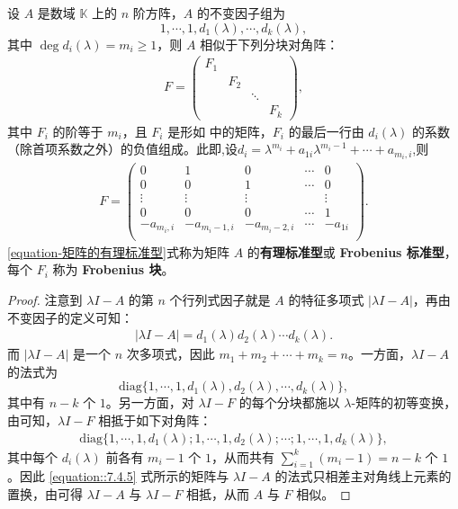 \documentclass[../../main.tex]{subfiles}
\begin{document}
\begin{theorem}
设 $A$ 是数域 $\mathbb{K}$ 上的 $n$ 阶方阵，$A$ 的不变因子组为
\[
1,\cdots,1,d_1(\lambda),\cdots,d_k(\lambda),
\]
其中 $\deg d_i(\lambda)=m_i\geq1$，则 $A$ 相似于下列分块对角阵：
\begin{align}\label{equation-矩阵的有理标准型}
F = \begin{pmatrix}
F_1 & & & \\
& F_2 & & \\
& & \ddots & \\
& & & F_k
\end{pmatrix},
\end{align}
其中 $F_i$ 的阶等于 $m_i$，且 $F_i$ 是形如 中的矩阵，$F_i$ 的最后一行由 $d_i(\lambda)$ 的系数（除首项系数之外）的负值组成。此即,设$d_i=\lambda ^{m_i}+a_{1i}\lambda ^{m_i-1}+\cdots +a_{m_i,i}$,则
\begin{align*}
F=\left( \begin{matrix}
0&		1&		0&		\cdots&		0\\
0&		0&		1&		\cdots&		0\\
\vdots&		\vdots&		\vdots&		&		\vdots\\
0&		0&		0&		\cdots&		1\\
-a_{m_i,i}&		-a_{m_i-1,i}&		-a_{m_i-2,i}&		\cdots&		-a_{1i}\\
\end{matrix} \right) .
\end{align*}
\eqref{equation-矩阵的有理标准型}式称为矩阵 $A$ 的\textbf{有理标准型}或 \textbf{Frobenius 标准型}，每个 $F_i$ 称为 \textbf{Frobenius 块}。 
\end{theorem}
\begin{proof}
注意到 $\lambda I - A$ 的第 $n$ 个行列式因子就是 $A$ 的特征多项式 $|\lambda I - A|$，再由不变因子的定义可知：
\begin{align*}
|\lambda I - A| = d_1(\lambda)d_2(\lambda)\cdots d_k(\lambda).
\end{align*}
而 $|\lambda I - A|$ 是一个 $n$ 次多项式，因此 $m_1 + m_2 + \cdots + m_k = n$。一方面，$\lambda I - A$ 的法式为
\[
\mathrm{diag}\{1,\cdots,1,d_1(\lambda),d_2(\lambda),\cdots,d_k(\lambda)\},
\]
其中有 $n - k$ 个 $1$。另一方面，对 $\lambda I - F$ 的每个分块都施以 $\lambda$-矩阵的初等变换，由可知，$\lambda I - F$ 相抵于如下对角阵：
\begin{align}
\mathrm{diag}\{1,\cdots,1,d_1(\lambda);1,\cdots,1,d_2(\lambda);\cdots;1,\cdots,1,d_k(\lambda)\},
\label{equation::7.4.5}
\end{align}
其中每个 $d_i(\lambda)$ 前各有 $m_i - 1$ 个 $1$，从而共有 $\sum_{i = 1}^{k}(m_i - 1)=n - k$ 个 $1$。因此 \eqref{equation::7.4.5} 式所示的矩阵与 $\lambda I - A$ 的法式只相差主对角线上元素的置换，由可得 $\lambda I - A$ 与 $\lambda I - F$ 相抵，从而 $A$ 与 $F$ 相似。
\end{proof}
\end{document}
